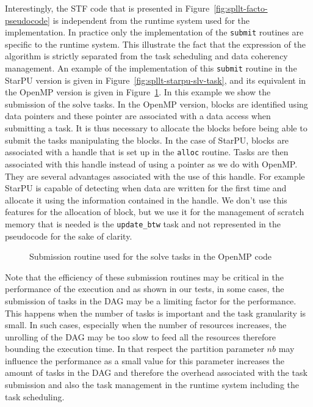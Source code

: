 \documentclass{article}
\newcommand{\starpu}{{StarPU}\xspace}
\newcommand{\openmp}{OpenMP\xspace}
\begin{document}
Interestingly, the STF code that is presented in
Figure~\ref{fig:spllt-facto-pseudocode} is independent from the
runtime system used for the implementation. In practice only the
implementation of the \texttt{submit} routines are specific to the
runtime system. This illustrate the fact that the expression of the
algorithm is strictly separated from the task scheduling and data
coherency management. An example of the implementation of this
\texttt{submit} routine in the \starpu version is given in
Figure~\ref{fig:spllt-starpu-slv-task}, and its equivalent in the
\openmp version is given in Figure~\ref{fig:spllt-omp-slv-task}. In
this example we show the submission of the solve tasks. In the \openmp
version, blocks are identified using data pointers and these pointer
are associated with a data access when submitting a task. It is thus
necessary to allocate the blocks before being able to submit the tasks
manipulating the blocks. In the case of \starpu, blocks are associated
with a handle that is set up in the \texttt{alloc} routine. Tasks are
then associated with this handle instead of using a pointer as we do
with \openmp. They are several advantages associated with the use of
this handle. For example \starpu is capable of detecting when data are
written for the first time and allocate it using the information
contained in the handle. We don't use this features for the allocation
of block, but we use it for the management of scratch memory that is
needed is the \texttt{update\_btw} task and not represented in the
pseudocode for the sake of clarity.

\begin{figure}[!h]
  \begin{minipage}{0.5\textwidth}
    \centering
    \lstset{basicstyle=\tt\scriptsize, language=C}
    
    \caption{\label{fig:spllt-starpu-slv-task} Submission routine used
      for the solve tasks in the \starpu code}
  \end{minipage}
  \hspace{0.5cm}
  \begin{minipage}{0.5\textwidth}
    \centering
    \lstset{basicstyle=\tt\scriptsize}
    
    \caption{\label{fig:spllt-omp-slv-task}Submission routine used
      for the solve tasks in the \openmp code}
  \end{minipage}
\end{figure}

Note that the efficiency of these submission routines may be critical
in the performance of the execution and as shown in our tests, in some
cases, the submission of tasks in the DAG may be a limiting factor for
the performance. This happens when the number of tasks is important
and the task granularity is small. In such cases, especially when the
number of resources increases, the unrolling of the DAG may be too
slow to feed all the resources therefore bounding the execution
time. In that respect the partition parameter $nb$ may influence the
performance as a small value for this parameter increases the amount
of tasks in the DAG and therefore the overhead associated with the
task submission and also the task management in the runtime system
including the task scheduling.
\end{document}
